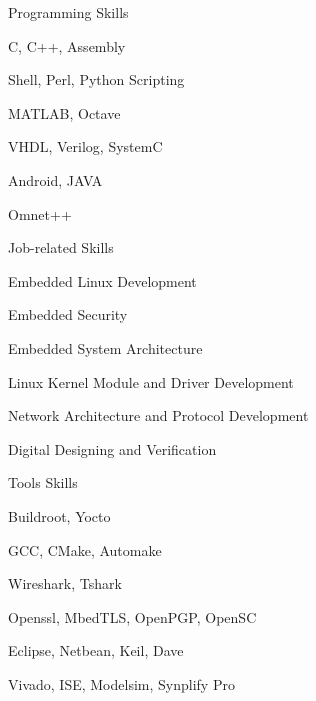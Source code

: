 

\begin{cvskills}

  \cvskill
    {Programming Skills} %
    {\begin{cvitems_3} %
        \item {C, C++, Assembly}
        \item {Shell, Perl, Python Scripting}
        \item {MATLAB, Octave}
        \item {VHDL, Verilog, SystemC}
        \item {Android, JAVA}
        \item {Omnet++}
      \end{cvitems_3}} %

  \cvskill
    {Job-related Skills} %
    {\begin{cvitems_3} %
        \item {Embedded Linux Development}
        \item {Embedded Security}
        \item {Embedded System Architecture}
        \item {Linux Kernel Module and Driver Development}
        \item {Network Architecture and Protocol Development}
        \item {Digital Designing and Verification}
      \end{cvitems_3}} %
      
  \cvskill
    {Tools Skills} %
    {\begin{cvitems_3} %
        \item {Buildroot, Yocto }
        \item {GCC, CMake, Automake}
        \item {Wireshark, Tshark}
        \item {Openssl, MbedTLS, OpenPGP, OpenSC}
        \item {Eclipse, Netbean, Keil, Dave}
        \item {Vivado, ISE, Modelsim, Synplify Pro}
      \end{cvitems_3}} %
      

\end{cvskills}
